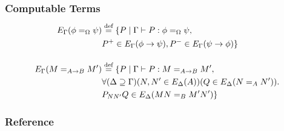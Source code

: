 \documentclass[handout]{beamer}
\newcommand{\eqdef}{\mathrel{\smash{\stackrel{\text{def}}{=}}}}
\begin{document}
\begin{frame}
\frametitle{Computable Terms}
\begin{align*}
E_\Gamma(\phi =_\Omega \psi) & \eqdef \{ P \mid \Gamma \vdash P : \phi =_\Omega \psi, \\
& P^+ \in E_\Gamma(\phi \rightarrow \psi), P^- \in E_\Gamma(\psi \rightarrow \phi) \} \\
\\
E_\Gamma(M =_{A \rightarrow B} M') & \eqdef \{ P \mid \Gamma \vdash P : M =_{A \rightarrow B} M', \\
& \forall (\Delta \supseteq \Gamma) (N, N' \in E_\Delta(A)) (Q \in E_\Delta(N =_A N')). \\
& P_{NN'}Q \in E_\Delta(MN =_B M'N') \}
\end{align*}
\end{frame}

\begin{frame}
\frametitle{Reference}

\end{frame}
\end{document}
